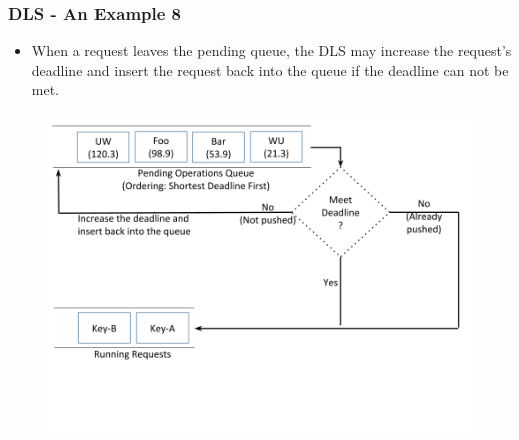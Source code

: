 \documentclass{beamer}
\begin{document}
\begin{frame}
  \frametitle{DLS - An Example 8}
  \begin{itemize}
  \item When a request leaves the pending queue, the DLS may increase the
    request's deadline and insert the request back into the queue if the
    deadline can not be met.
  \end{itemize}
  \begin{figure}
    \begin{center}
      \centerline{\includegraphics[scale=0.33]{img/DLS_Example9.png}}
    \end{center}
  \end{figure}


\end{frame}
\end{document}
